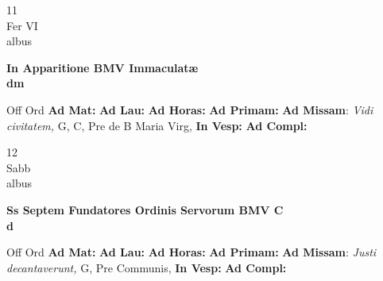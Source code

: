 \documentclass[10pt, openany]{book}
\begin{document}
        \begin{center}
            \begin{minipage}{3.5in}
                \vspace{2em}
                \begin{minipage}{0.5in}
                    {\Huge 11} \\
                    {\normalsize Fer VI} \\
                    {\normalsize albus}
                \end{minipage}
                \begin{minipage}{3.0in}
                    \textbf{ \large In Apparitione BMV Immaculatæ \\
                    \textnormal{\normalsize dm}} \\ 
                \end{minipage}
                \begin{justify}Off Ord
                    \textbf{Ad Mat: }
                    \textbf{Ad Lau: }
                    \textbf{Ad Horas: }
                    \textbf{Ad Primam: }\textbf{Ad Missam}: \textit{Vidi civitatem,} G, C, Pre de B Maria Virg,  
                    \textbf{In Vesp: }
                    \textbf{Ad Compl: }
                \end{justify}
            \end{minipage}
        \end{center}
    
        \begin{center}
            \begin{minipage}{3.5in}
                \vspace{2em}
                \begin{minipage}{0.5in}
                    {\Huge 12} \\
                    {\normalsize Sabb} \\
                    {\normalsize albus}
                \end{minipage}
                \begin{minipage}{3.0in}
                    \textbf{ \large Ss Septem Fundatores Ordinis Servorum BMV C \\
                    \textnormal{\normalsize d}} \\ 
                \end{minipage}
                \begin{justify}Off Ord
                    \textbf{Ad Mat: }
                    \textbf{Ad Lau: }
                    \textbf{Ad Horas: }
                    \textbf{Ad Primam: }\textbf{Ad Missam}: \textit{Justi decantaverunt,} G, Pre Communis,  
                    \textbf{In Vesp: }
                    \textbf{Ad Compl: }
                \end{justify}
            \end{minipage}
        \end{center}
    
\end{document}
